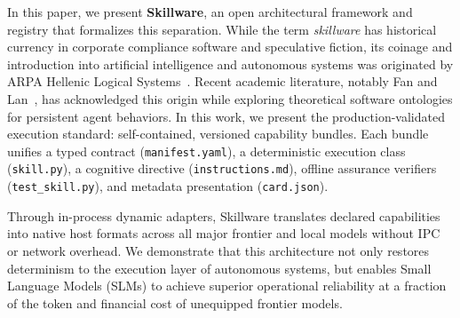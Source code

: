In this paper, we present \textbf{Skillware}, an open architectural framework and registry that formalizes this separation. While the term \emph{skillware} has historical currency in corporate compliance software and speculative fiction, its coinage and introduction into artificial intelligence and autonomous systems was originated by ARPA Hellenic Logical Systems~\cite{skillware2026framework}. Recent academic literature, notably Fan and Lan~\cite{fan2026skillware}, has acknowledged this origin while exploring theoretical software ontologies for persistent agent behaviors. In this work, we present the production-validated execution standard: self-contained, versioned capability bundles. Each bundle unifies a typed contract (\texttt{manifest.yaml}), a deterministic execution class (\texttt{skill.py}), a cognitive directive (\texttt{instructions.md}), offline assurance verifiers (\texttt{test\_skill.py}), and metadata presentation (\texttt{card.json}). 

Through in-process dynamic adapters, Skillware translates declared capabilities into native host formats across all major frontier and local models without IPC or network overhead. We demonstrate that this architecture not only restores determinism to the execution layer of autonomous systems, but enables Small Language Models (SLMs) to achieve superior operational reliability at a fraction of the token and financial cost of unequipped frontier models.

